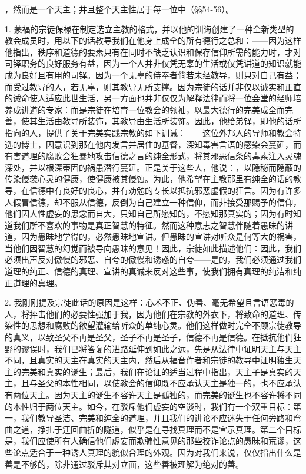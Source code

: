 ，然而是一个天主；并且整个天主性居于每一位中（§§54-56）。\par

1. 蒙福的宗徒保禄在制定选立主教的格式，并以他的训诲创建了一种全新类型的教会成员时，用以下的话教导我们在他身上成全的所有德行之总和：——因为这样他指出，秩序和道德的要素只有在同时不缺乏认识和保存信仰所需的能力时，才对司铎职务的良好服务有益，因为一个人并非仅凭无辜的生活或仅凭讲道的知识就能成为良好且有用的司铎。因为一个无辜的侍奉者倘若未经教导，则只对自己有益；而受过教导的人，若无辜，则其教导无所支撑。因为宗徒的话并非仅以诚实和正直的诫命使人适应此世生活，另一方面也并非仅仅为解释法律而将一位会堂的经师培养成讲道的专家：而是宗徒在培育一位教会的领袖，以最大德行的完美成全而完善，使其生活由教导所装饰，其教导由生活所装饰。因此，他给弟铎，即他的话所指向的人，提供了关于完美实践宗教的如下训诫：——这位外邦人的导师和教会特选的博士，因意识到那在他内发言并居住的基督，深知毒害言语的感染会蔓延，而有害道理的腐败会狂暴地攻击信德之言的纯全形式，将其邪恶信条的毒素注入灵魂深处，并以根深蒂固的祸患潜行蔓延。正是关于这些人，他说：，以隐秘而隐蔽的传染侵袭心灵的健康，使健康被其侵蚀。为此，他希望在主教那里有纯全的话的教导，在信德中有良好的良心，并有劝勉的专长以抵抗邪恶虚假的狂言。因为有许多人假冒信德，却不服从信德，反倒为自己建立一种信仰，而非接受那赐予的信仰，他们因人性虚妄的思念而自大，只知自己所愿知的，不愿知那真实的；因为有时知道我们所不喜欢的事物是真正智慧的特征。然而这种意志之智慧伴随着愚昧的讲道，因为愚昧地学得的，必然愚昧地宣讲。但愚昧的宣讲对听众是何等大的祸害，当他们因智慧的幻觉而被导向愚昧的意见！因此，宗徒如此描述他们：因此，我们必须出声反对傲慢的邪恶、自夸的傲慢和诱惑的自夸——是的，我们必须通过我们道理的纯正、信德的真理、宣讲的真诚来反对这些事，使我们拥有真理的纯洁和纯正道理的真理。\par

2. 我刚刚提及宗徒此话的原因是这样：心术不正、伪善、毫无希望且言语恶毒的人，将抨击他们的必要性强加于我，因为他们在宗教的外衣下，将致命的道理、传染性的思想和腐败的欲望灌输给听众的单纯心灵。他们这样做时完全不顾宗徒教导的真义，以致圣父不再是圣父，圣子不再是圣子，信德不再是信德。在抵抗他们狂野的谬误时，我们已将答复的进路延伸到如此之远，先是从法律中证明天主与天主不同，且真实的天主在真实的天主内，然后从福音作者和宗徒的教导中证明独生天主的完美和真实的诞生；最后，我们在论证的适当过程中指出，天主子是真实的天主，且与圣父的本性相同，以使教会的信仰既不应承认天主是独一的，也不应承认有两位天主。因为天主的诞生不容许天主是孤独的，而完美的诞生也不容许将不同的本性归于两位天主。如今，在驳斥他们虚妄的空谈时，我们有一个双重目标：第一，我们教导圣洁、完美和纯全的道理，并且我们的讲论不应迷失于任何旁路和弯曲之道，挣扎于迂回曲折的隧道，似乎是在寻找真理而不是宣示真理。第二个目标是，我们应使所有人确信他们虚妄而欺骗性意见的那些狡诈论点的愚昧和荒谬，这些论点适合于一种诱人真理的貌似合理的外观。因为对我们来说，仅仅指出什么是善是不够的，除非通过驳斥其对立面，这些善被理解为绝对的善。\par

